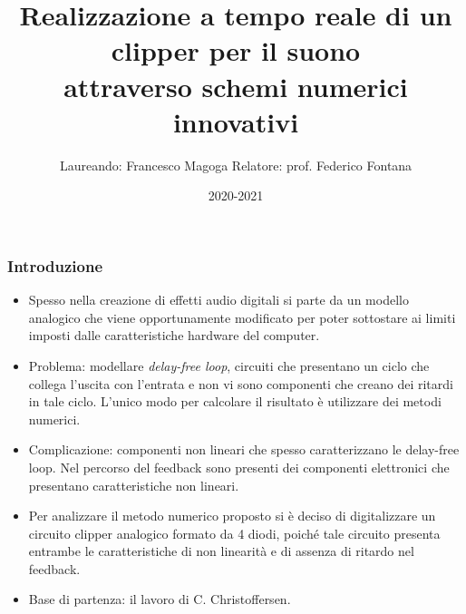 \documentclass[11pt, t, aspectratio=169]{beamer}
\title{Realizzazione a tempo reale di un clipper per il suono\\attraverso schemi numerici innovativi}
\author{Laureando: Francesco Magoga \qquad\qquad Relatore: prof. Federico Fontana}
\institute{Dipartimento di Scienze Matematiche, Informatiche e Fisiche\\
		Corso di laurea in informatica magistrale}
\date{2020-2021}
\begin{document}
	\begin{frame}
		\titlepage
	\end{frame}
	
	\begin{frame}
		\frametitle{Introduzione}
		
		{\small
		\begin{itemize}
			\item Spesso nella creazione di effetti audio digitali si parte da un modello analogico che viene opportunamente modificato per poter sottostare ai limiti imposti dalle caratteristiche hardware del computer.
			\item Problema: modellare \textit{delay-free loop}, circuiti che presentano un ciclo che collega l'uscita con l'entrata e non vi sono componenti che creano dei ritardi in tale ciclo. L'unico modo per calcolare il risultato è utilizzare dei metodi numerici.
			\item Complicazione: componenti non lineari che spesso caratterizzano le delay-free loop. Nel percorso del feedback sono presenti dei componenti elettronici che presentano caratteristiche non lineari.
			\item Per analizzare il metodo numerico proposto si è deciso di digitalizzare un circuito clipper analogico formato da 4 diodi, poiché tale circuito presenta entrambe le caratteristiche di non linearità e di assenza di ritardo nel feedback.
			\item Base di partenza: il lavoro di C. Christoffersen.
		\end{itemize}
		}
		
	\end{frame}
\end{document}
